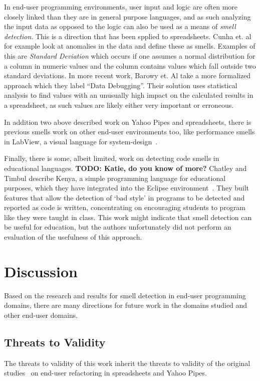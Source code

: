 \documentclass{sig-alternate}
\newcommand{\todo}[1]{\textbf{TODO: #1}}
\begin{document}
In end-user programming environments, user input and logic are often more closely linked than they are in general purpose languages, and as such analyzing the input data as opposed to the logic can also be used as a means of \emph{smell detection}. This is a direction that has been spplied to spreadsheets. Cunha et. al \cite{cunha2012towards} for example look at anomalies in the data and define these as smells. Examples of this are \textit{Standard Deviation} which occurs if one assumes a normal distribution for a column in numeric values and the column contains values which fall outside two standard deviations. In more recent work, Barowy et. Al \cite{barowy2014checkcell} take a more formalized approach which they label ``Data Debugging''. Their solution uses statistical analysis to find values with an unusually high impact on the calculated results in a spreadsheet, as such values are likely either very important or erroneous.

In addition two above described work on Yahoo Pipes and spreadsheets, there is previous smells work on other end-user environments too, like performance smells in LabView, a visual language for system-design~\cite{chambers2013smell, chambers2015impact}. 

Finally, there is some, albeit limited, work on detecting code smells in educational languages. \todo{Katie, do you know of more?} Chatley and Timbul describe Kenya, a simple programming language for educational purposes, which they have integrated into the Eclipse environment~\cite{Chatley2005}. They built features that allow the detection of `bad style' in programs to be detected and reported as code is written, concentrating on encouraging students to program like they were taught in class. This work might indicate that smell detection can be useful for education, but the authors unfortunately did not perform an evaluation of the usefulness of this approach.



\section{Discussion}
\label{sec:discussion}

Based on the research and results for smell detection in end-user programming domains, there are many directions for future work in the domains studied and other end-user domains.





\subsection{Threats to Validity}
The threats to validity of this work inherit the threats to validity of the original studies~\cite{Stolee2015, Stolee2011, StoleeTSE2013, Hermans2011, Hermans2012intra, Hermans2012inter, hermans2014bumblebee, badame2012refactoring} on end-user refactoring in spreadsheets and Yahoo Pipes.
\end{document}
